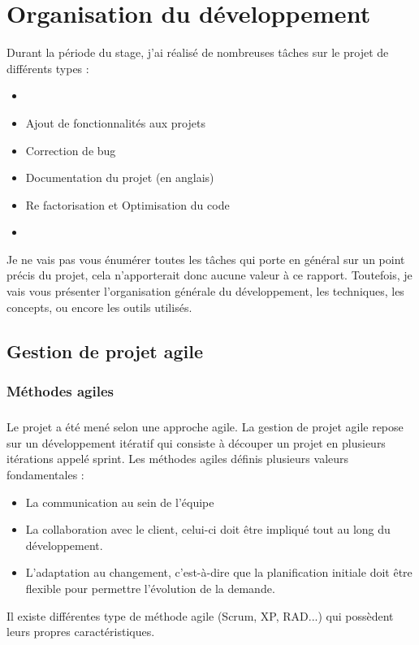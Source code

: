 \chapter{Organisation du développement}
Durant la période du stage, j'ai réalisé de nombreuses tâches sur le projet de différents types : 
\begin{itemize}
\item[]
\item Ajout de fonctionnalités aux projets
\item Correction de bug
\item Documentation du projet (en anglais)
\item Re factorisation et Optimisation du code
\item[]
\end{itemize}

Je ne vais pas vous énumérer toutes les tâches qui porte en général sur un point précis du projet,  cela n'apporterait donc aucune valeur à ce rapport. Toutefois, je vais vous présenter l'organisation générale du développement, les techniques, les concepts, ou encore les outils utilisés.

\section{Gestion de projet agile}
\subsection{Méthodes agiles}
\paragraph{}
Le projet a été mené selon une approche agile. La gestion de projet agile repose sur un développement itératif qui consiste à découper un projet en plusieurs itérations appelé sprint. Les méthodes agiles définis plusieurs valeurs fondamentales : 
\begin{itemize}
\item La communication au sein de l'équipe
\item La collaboration avec le client, celui-ci doit être impliqué tout au long du développement.
\item L'adaptation au changement, c'est-à-dire que la planification initiale doit être flexible pour permettre l'évolution de la demande. 
\end{itemize}
Il existe différentes type de méthode agile (Scrum, XP, RAD...) qui possèdent leurs propres caractéristiques.
